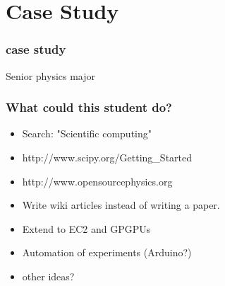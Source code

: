 \section{Case Study}
\begin{comment}
* Cases
** Case study: Scientific Computing (we know this target exists)
*** Target user: a senior physics major who knows some C, and wants to either 1) contribute to a project or 2) do some research and feed it back into a community
*** Write wiki articles instead of writing a paper.
*** http://www.scipy.org/Getting_Started
*** http://www.opensourcephysics.org/
**** Extend with projects that run on the EC2 compute cloud / GPGPUs
*** Automation of experiments / Arduino
\end{comment}



\begin{frame} 
\frametitle{case study}
\huge
\begin{center}
Senior physics major
\end{center}
\end{frame} 



\begin{frame} 
\frametitle{What could this student do?}
\begin{itemize}
	\item Search: "Scientific computing"
	\item http://www.scipy.org/Getting\_Started
	\item http://www.opensourcephysics.org
	\item Write wiki articles instead of writing a paper.
	\item Extend to EC2 and GPGPUs
	\item Automation of experiments (Arduino?)
	\item other ideas?
\end{itemize}
\end{frame}
